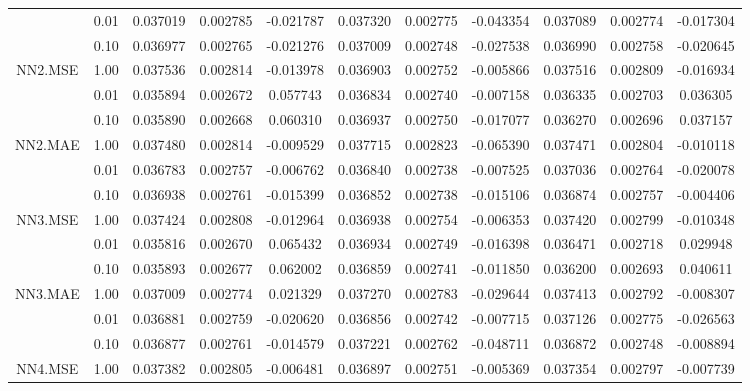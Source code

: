 \begin{longtable}{ccccccccccc}
\cmidrule{1-11}
 & 0.01 & 0.037019 & 0.002785 & -0.021787 & 0.037320 & 0.002775 & -0.043354 & 0.037089 & 0.002774 & -0.017304\\
\cmidrule{2-11}
 & 0.10 & 0.036977 & 0.002765 & -0.021276 & 0.037009 & 0.002748 & -0.027538 & 0.036990 & 0.002758 & -0.020645\\
\cmidrule{2-11}
\multirow{-3}{*}{\centering\arraybackslash NN2.MSE} & 1.00 & 0.037536 & 0.002814 & -0.013978 & 0.036903 & 0.002752 & -0.005866 & 0.037516 & 0.002809 & -0.016934\\
\cmidrule{1-11}
 & 0.01 & 0.035894 & 0.002672 & 0.057743 & 0.036834 & 0.002740 & -0.007158 & 0.036335 & 0.002703 & 0.036305\\
\cmidrule{2-11}
 & 0.10 & 0.035890 & 0.002668 & 0.060310 & 0.036937 & 0.002750 & -0.017077 & 0.036270 & 0.002696 & 0.037157\\
\cmidrule{2-11}
\multirow{-3}{*}{\centering\arraybackslash NN2.MAE} & 1.00 & 0.037480 & 0.002814 & -0.009529 & 0.037715 & 0.002823 & -0.065390 & 0.037471 & 0.002804 & -0.010118\\
\cmidrule{1-11}
 & 0.01 & 0.036783 & 0.002757 & -0.006762 & 0.036840 & 0.002738 & -0.007525 & 0.037036 & 0.002764 & -0.020078\\
\cmidrule{2-11}
 & 0.10 & 0.036938 & 0.002761 & -0.015399 & 0.036852 & 0.002738 & -0.015106 & 0.036874 & 0.002757 & -0.004406\\
\cmidrule{2-11}
\multirow{-3}{*}{\centering\arraybackslash NN3.MSE} & 1.00 & 0.037424 & 0.002808 & -0.012964 & 0.036938 & 0.002754 & -0.006353 & 0.037420 & 0.002799 & -0.010348\\
\cmidrule{1-11}
 & 0.01 & 0.035816 & 0.002670 & 0.065432 & 0.036934 & 0.002749 & -0.016398 & 0.036471 & 0.002718 & 0.029948\\
\cmidrule{2-11}
 & 0.10 & 0.035893 & 0.002677 & 0.062002 & 0.036859 & 0.002741 & -0.011850 & 0.036200 & 0.002693 & 0.040611\\
\cmidrule{2-11}
\multirow{-3}{*}{\centering\arraybackslash NN3.MAE} & 1.00 & 0.037009 & 0.002774 & 0.021329 & 0.037270 & 0.002783 & -0.029644 & 0.037413 & 0.002792 & -0.008307\\
\cmidrule{1-11}
 & 0.01 & 0.036881 & 0.002759 & -0.020620 & 0.036856 & 0.002742 & -0.007715 & 0.037126 & 0.002775 & -0.026563\\
\cmidrule{2-11}
 & 0.10 & 0.036877 & 0.002761 & -0.014579 & 0.037221 & 0.002762 & -0.048711 & 0.036872 & 0.002748 & -0.008894\\
\cmidrule{2-11}
\multirow{-3}{*}{\centering\arraybackslash NN4.MSE} & 1.00 & 0.037382 & 0.002805 & -0.006481 & 0.036897 & 0.002751 & -0.005369 & 0.037354 & 0.002797 & -0.007739\\

\end{longtable}
